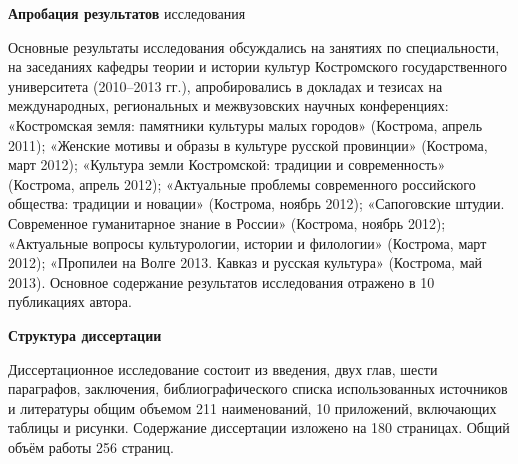 \textbf{Апробация результатов} исследования

Основные результаты исследования обсуждались на занятиях по специальности, на заседаниях кафедры теории и истории культур Костромского государственного университета (2010–2013 гг.), апробировались в докладах и тезисах на международных, региональных и межвузовских научных конференциях: «Костромская земля: памятники культуры малых городов» (Кострома, апрель 2011); «Женские мотивы и образы в культуре русской провинции» (Кострома, март 2012); «Культура земли Костромской: традиции и современность» (Кострома, апрель 2012); «Актуальные проблемы современного российского общества: традиции и новации» (Кострома, ноябрь 2012); «Сапоговские штудии. Современное гуманитарное знание в России» (Кострома, ноябрь 2012); «Актуальные вопросы культурологии, истории и филологии» (Кострома, март 2012); «Пропилеи на Волге 2013. Кавказ и русская культура» (Кострома, май 2013). Основное содержание результатов исследования отражено в 10 публикациях автора.

\textbf{Структура диссертации}

Диссертационное исследование состоит из введения, двух глав, шести параграфов, заключения, библиографического списка использованных источников и литературы общим объемом 211 наименований, 10 приложений, включающих таблицы и рисунки. Содержание диссертации изложено на 180 страницах. Общий объём работы 256 страниц.
